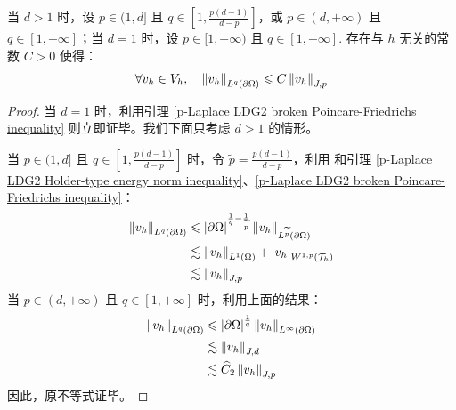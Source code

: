 \begin{lemma}\label{p-Laplace LDG2 broken trace inequality}
	当 \(d > 1\) 时，设 \(p \in (1, d]\) 且 \(q \in [1, \frac{p(d-1)}{d-p}]\)，或 \(p \in (d, +\infty)\) 且 \(q \in [1, +\infty]\)；当 \(d = 1\) 时，设 \(p \in [1, +\infty)\) 且 \(q \in [1, +\infty]\). 存在与 \(h\) 无关的常数 \(C > 0\) 使得：
	\begin{equation}
		\forall v_{h} \in V_{h}, \quad
		\left\lVert v_{h}\right\rVert_{L^{q}(\partial\Omega)} \leqslant C \left\lVert v_{h}\right\rVert_{J, p}
	\end{equation}
	
	\begin{proof}
		当 \(d = 1\) 时，利用引理 \ref{p-Laplace LDG2 broken Poincare-Friedrichs inequality} 则立即证毕。我们下面只考虑 \(d > 1\) 的情形。

		当 \(p \in (1, d]\) 且 \(q \in [1, \frac{p(d-1)}{d-p}]\) 时，令 \(\widetilde{p} = \frac{p(d-1)}{d-p}\)，利用 \cite[Theorem 4.4]{10.1093/imanum/drn038} 和引理 \ref{p-Laplace LDG2 Holder-type energy norm inequality}、\ref{p-Laplace LDG2 broken Poincare-Friedrichs inequality}：
		\begin{align*}
			\left\lVert v_{h}\right\rVert_{L^{q}(\partial\Omega)} 
			& \leqslant \left\lvert\partial\Omega\right\rvert^{\frac{1}{q} - \frac{1}{\widetilde{p}}} \left\lVert v_{h}\right\rVert_{L^{\widetilde{p}}(\partial\Omega)} \\
			& \lesssim \left\lVert v_{h}\right\rVert_{L^{1}(\Omega)} + \left\lvert v_{h}\right\rvert_{W^{1,p}(\mathcal{T}_{h})} \\
			& \lesssim \left\lVert v_{h}\right\rVert_{J, p}
		\end{align*}
		当 \(p \in (d, +\infty)\) 且 \(q \in [1, +\infty]\) 时，利用上面的结果：
		\begin{align*}
			\left\lVert v_{h}\right\rVert_{L^{q}(\partial\Omega)} 
			& \leqslant \left\lvert\partial \Omega\right\rvert^{\frac{1}{q}} \left\lVert v_{h}\right\rVert_{L^\infty(\partial\Omega)} \\
			& \lesssim \left\lVert v_{h}\right\rVert_{J, d} \\
			& \lesssim \widehat{C}_{2} \left\lVert v_{h}\right\rVert_{J, p}
		\end{align*}
		因此，原不等式证毕。
	\end{proof}
\end{lemma}


